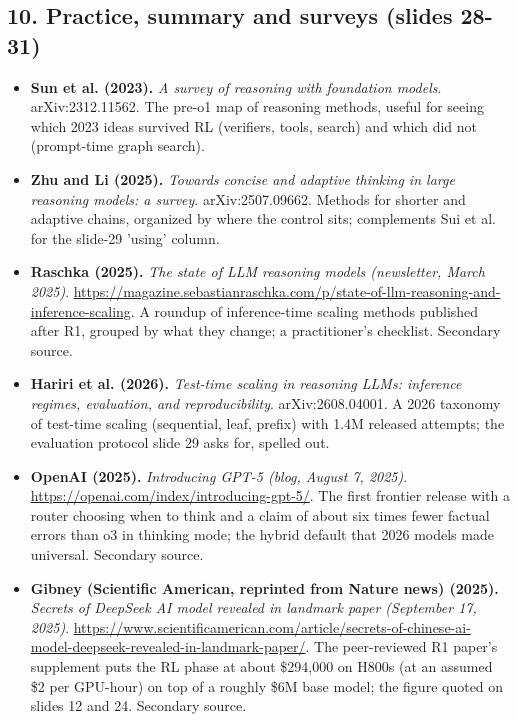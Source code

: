 \documentclass[11pt,letterpaper]{article}
\begin{document}
\subsection*{10. Practice, summary and surveys (slides 28-31)}
\begin{itemize}[leftmargin=1.2em,itemsep=3pt]\sloppy
\item \textbf{Sun et al. (2023).} \textit{A survey of reasoning with foundation models}. arXiv:2312.11562. The pre-o1 map of reasoning methods, useful for seeing which 2023 ideas survived RL (verifiers, tools, search) and which did not (prompt-time graph search).
\item \textbf{Zhu and Li (2025).} \textit{Towards concise and adaptive thinking in large reasoning models: a survey}. arXiv:2507.09662. Methods for shorter and adaptive chains, organized by where the control sits; complements Sui et al. for the slide-29 'using' column.
\item \textbf{Raschka (2025).} \textit{The state of LLM reasoning models (newsletter, March 2025)}. \url{https://magazine.sebastianraschka.com/p/state-of-llm-reasoning-and-inference-scaling}. A roundup of inference-time scaling methods published after R1, grouped by what they change; a practitioner's checklist. Secondary source.
\item \textbf{Hariri et al. (2026).} \textit{Test-time scaling in reasoning LLMs: inference regimes, evaluation, and reproducibility}. arXiv:2608.04001. A 2026 taxonomy of test-time scaling (sequential, leaf, prefix) with 1.4M released attempts; the evaluation protocol slide 29 asks for, spelled out.
\item \textbf{OpenAI (2025).} \textit{Introducing GPT-5 (blog, August 7, 2025)}. \url{https://openai.com/index/introducing-gpt-5/}. The first frontier release with a router choosing when to think and a claim of about six times fewer factual errors than o3 in thinking mode; the hybrid default that 2026 models made universal. Secondary source.
\item \textbf{Gibney (Scientific American, reprinted from Nature news) (2025).} \textit{Secrets of DeepSeek AI model revealed in landmark paper (September 17, 2025)}. \url{https://www.scientificamerican.com/article/secrets-of-chinese-ai-model-deepseek-revealed-in-landmark-paper/}. The peer-reviewed R1 paper's supplement puts the RL phase at about \$294,000 on H800s (at an assumed \$2 per GPU-hour) on top of a roughly \$6M base model; the figure quoted on slides 12 and 24. Secondary source.
\end{itemize}
\clearpage
\printindex
\end{document}
